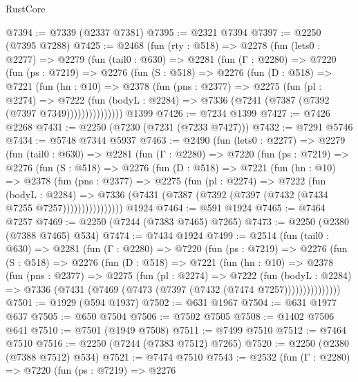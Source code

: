 \begin{lexlean}{RustCore}
\begin{coremodule}
@7394 := @7339 (@2337 @7381)
@7395 := @2321 @7394
@7397 := @2250 (@7395 @7288)
@7425 := @2468
    (fun (rty : @518) =>
    @2278
      (fun (lets0 : @2277) =>
      @2279
        (fun (tail0 : @630) =>
        @2281
          (fun (Γ : @2280) =>
          @7220
            (fun (ps : @7219) =>
            @2276
              (fun (S : @518) =>
              @2276
                (fun (D : @518) =>
                @7221
                  (fun (hn : @10) =>
                  @2378
                    (fun (pns : @2377) =>
                    @2275
                      (fun (pl : @2274) =>
                      @7222
                        (fun (bodyL : @2284) =>
                        @7336 (@7241 (@7387 (@7392 (@7397 @7349)))))))))))))))
    @1399
@7426 := @7234 @1399
@7427 := @7426 @2268
@7431 := @2250 (@7230 (@7231 (@7233 @7427)))
@7432 := @7291 @5746
@7434 := @5748 @7344 @5937
@7463 := @2490
    (fun (lets0 : @2277) =>
    @2279
      (fun (tail0 : @630) =>
      @2281
        (fun (Γ : @2280) =>
        @7220
          (fun (ps : @7219) =>
          @2276
            (fun (S : @518) =>
            @2276
              (fun (D : @518) =>
              @7221
                (fun (hn : @10) =>
                @2378
                  (fun (pns : @2377) =>
                  @2275
                    (fun (pl : @2274) =>
                    @7222
                      (fun (bodyL : @2284) =>
                      @7336 (@7431 (@7387 (@7392 (@7397 (@7432 (@7434 @7255 @7257))))))))))))))))
    @1924
@7464 := @591 @1924
@7465 := @7464 @7257
@7469 := @2250 (@7244 (@7383 @7465) @7265)
@7473 := @2250 (@2380 (@7388 @7465) @534)
@7474 := @7434 @1924
@7499 := @2514
    (fun (tail0 : @630) =>
    @2281
      (fun (Γ : @2280) =>
      @7220
        (fun (ps : @7219) =>
        @2276
          (fun (S : @518) =>
          @2276
            (fun (D : @518) =>
            @7221
              (fun (hn : @10) =>
              @2378
                (fun (pns : @2377) =>
                @2275
                  (fun (pl : @2274) =>
                  @7222
                    (fun (bodyL : @2284) =>
                    @7336 (@7431 (@7469 (@7473 (@7397 (@7432 (@7474 @7257)))))))))))))))
@7501 := @1929 (@594 @1937)
@7502 := @631 @1967
@7504 := @631 @1977 @637
@7505 := @650 @7504
@7506 := @7502 @7505
@7508 := @1402 @7506 @641
@7510 := @7501 (@1949 @7508)
@7511 := @7499 @7510
@7512 := @7464 @7510
@7516 := @2250 (@7244 (@7383 @7512) @7265)
@7520 := @2250 (@2380 (@7388 @7512) @534)
@7521 := @7474 @7510
@7543 := @2532
    (fun (Γ : @2280) =>
    @7220
      (fun (ps : @7219) =>
      @2276

\end{coremodule}
\end{lexlean}
